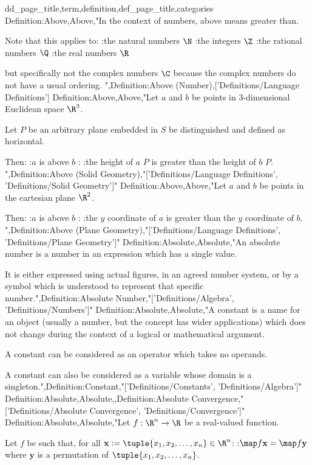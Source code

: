 \usepackage{XZVT-private}
dd_page_title,term,definition,def_page_title,categories
Definition:Above,Above,"In the context of numbers, above means greater than.

Note that this applies to:
:the natural numbers $\N$
:the integers $\Z$
:the rational numbers $\Q$
:the real numbers $\R$

but specifically not the complex numbers $\C$ because the complex numbers do not have a usual ordering.
",Definition:Above (Number),['Definitions/Language Definitions']
Definition:Above,Above,"Let $a$ and $b$ be points in $3$-dimensional Euclidean space $\R^3$.

Let $P$ be an arbitrary plane embedded in $S$ be distinguished and defined as horizontal.

Then:
:$a$ is above $b$
:
:the height of $a$  $P$ is greater than the height of $b$  $P$.
",Definition:Above (Solid Geometry),"['Definitions/Language Definitions', 'Definitions/Solid Geometry']"
Definition:Above,Above,"Let $a$ and $b$ be points in the cartesian plane $\R^2$.

Then:
:$a$ is above $b$
:
:the $y$ coordinate of $a$ is greater than the $y$ coordinate of $b$.
",Definition:Above (Plane Geometry),"['Definitions/Language Definitions', 'Definitions/Plane Geometry']"
Definition:Absolute,Absolute,"An absolute number is a number in an expression which has a single value.

It is either expressed using actual figures, in an agreed number system, or by a symbol which is understood to represent that specific number.",Definition:Absolute Number,"['Definitions/Algebra', 'Definitions/Numbers']"
Definition:Absolute,Absolute,"A constant is a name for an object (usually a number, but the concept has wider applications) which does not change during the context of a logical or mathematical argument.


A constant can be considered as an operator which takes no operands.

A constant can also be considered as a variable whose domain is a singleton.",Definition:Constant,"['Definitions/Constants', 'Definitions/Algebra']"
Definition:Absolute,Absolute,,Definition:Absolute Convergence,"['Definitions/Absolute Convergence', 'Definitions/Convergence']"
Definition:Absolute,Absolute,"Let $f: \R^n \to \R$ be a real-valued function.

Let $f$ be such that, for all $\mathbf x := \tuple {x_1, x_2, \ldots, x_n} \in \R^n$:
:$\map f {\mathbf x} = \map f {\mathbf y}$
where $\mathbf y$ is a permutation of $\tuple {x_1, x_2, \ldots, x_n}$.

